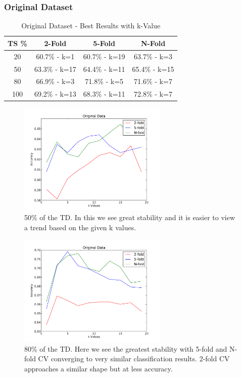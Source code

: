\documentclass[conference]{acmsiggraph}
\begin{document}
\subsubsection{Original Dataset}
\begin{table}[h]
\caption{Original Dataset - Best Results with k-Value}
\centering
\begin{tabular}{c c c c}
\hline\hline
TS \% & 2-Fold & 5-Fold & N-Fold \\ [0.5ex]
\hline
20 & 60.7\% - k=1 & 60.7\% - k=19 & 63.7\% - k=3 \\
50 & 63.3\% - k=17 & 64.4\% - k=11 & 65.4\% - k=15 \\
80 & 66.9\% - k=3 & 71.8\% - k=5 & 71.6\% - k=7 \\
100 & 69.2\% - k=13 & 68.3\% - k=11 & 72.8\% - k=7 \\
\hline
\end{tabular}
\label{alc_o_res_table}
\end{table}

\begin{figure}[h]
  \centering
  \includegraphics[width=2.8in]{images/alc_o_50.pdf}
  \caption{50\% of the TD. In this we see great stability and it is easier to view a trend based on the given k values.}
\end{figure}
\begin{figure}[h]
  \centering
  \includegraphics[width=2.8in]{images/alc_o_80.pdf}
  \caption{80\% of the TD. Here we see the greatest stability with 5-fold and N-fold CV converging to very similar classification results. 2-fold CV approaches a similar shape but at less accuracy.}
\end{figure}
\end{document}
